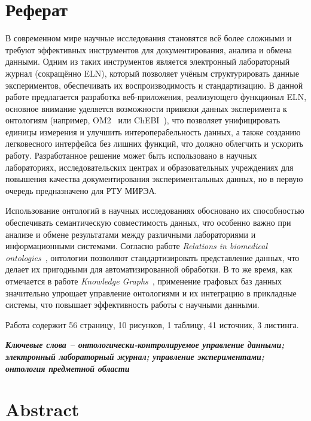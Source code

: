 \section*{\centering Реферат}
В современном мире научные исследования становятся всё более сложными и требуют эффективных инструментов для документирования, анализа и обмена данными.
Одним из таких инструментов является электронный лабораторный журнал (сокращённо ELN), который позволяет учёным структурировать данные экспериментов, обеспечивать их воспроизводимость и стандартизацию.
В данной работе предлагается разработка веб-приложения, реализующего функционал ELN, основное внимание уделяется возможности привязки данных эксперимента к онтологиям (например, OM2~\cite{ontology:OM2} или ChEBI~\cite{ontology:СhEBI}), что позволяет унифицировать единицы измерения и улучшить интероперабельность данных, а также созданию легковесного интерфейса без лишних функций, что должно облегчить и ускорить работу.
Разработанное решение может быть использовано в научных лабораториях, исследовательских центрах и образовательных учреждениях для повышения качества документирования экспериментальных данных, но в первую очередь предназначено для РТУ МИРЭА.

Использование онтологий в научных исследованиях обосновано их способностью обеспечивать семантическую совместимость данных, что особенно важно при анализе и обмене результатами между различными лабораториями и информационными системами.
Согласно работе \textit{Relations in biomedical ontologies}~\cite{ontology:base1}, онтологии позволяют стандартизировать представление данных, что делает их пригодными для автоматизированной обработки.
В то же время, как отмечается в работе \textit{Knowledge Graphs}~\cite{ontology:base2}, применение графовых баз данных значительно упрощает управление онтологиями и их интеграцию в прикладные системы, что повышает эффективность работы с научными данными.

Работа содержит 56 страницу, 10 рисунков, 1 таблицу, 41 источник, 3 листинга.

\textit{\textbf{Ключевые слова -- онтологически-контролируемое управление данными; электронный лабораторный журнал; управление экспериментами; онтология предметной области}}

\newpage

\section*{\centering Abstract}

